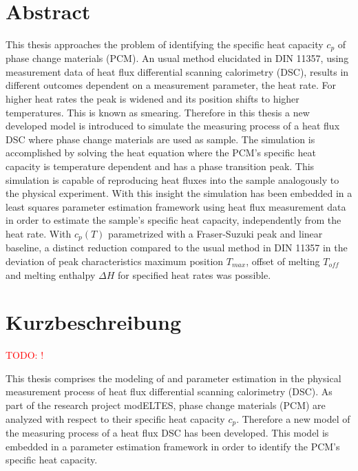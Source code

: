 \documentclass{scrartcl}[12pt, halfparskip]
\numberwithin{equation}{section}
\numberwithin{figure}{section}
\numberwithin{table}{section}
\newcommand{\todo}[1]{\textcolor{red}{TODO: #1}}
\begin{document}
\newpage


\begin{titlepage}
	\mbox{}\\
\end{titlepage}



\section*{Abstract}

This thesis approaches the problem of identifying the specific heat capacity $c_p$ of phase change materials (PCM). 
An usual method elucidated in DIN 11357, using measurement data of heat flux differential scanning calorimetry (DSC), results in different outcomes dependent on a measurement parameter, the heat rate. For higher heat rates the peak is widened and its position shifts to higher temperatures. This is known as smearing.
Therefore in this thesis a new developed model is introduced to simulate the measuring process of a heat flux DSC where phase change materials are used as sample. 
The simulation is accomplished by solving the heat equation where the PCM's specific heat capacity is temperature dependent and has a phase transition peak. 
This simulation is capable of reproducing heat fluxes into the sample analogously to the physical experiment. 
With this insight the simulation has been embedded in a least squares parameter estimation framework using heat flux measurement data in order to estimate the sample's specific heat capacity, independently from the heat rate. 
With $c_p(T)$ parametrized with a Fraser-Suzuki peak and linear baseline, a distinct reduction compared to the usual method in DIN 11357 in the deviation of peak characteristics maximum position $T_{max}$, offset of melting $T_{off}$ and melting enthalpy $\Delta H$ for specified heat rates was possible.



\section*{Kurzbeschreibung}

\todo{!}

\newpage



\tableofcontents 
\newpage


This thesis comprises the modeling of and parameter estimation in the physical measurement process of heat flux differential scanning calorimetry (DSC). As part of the research project modELTES, phase change materials (PCM) are analyzed with respect to their specific heat capacity $c_p$. Therefore a new model of the measuring process of a heat flux DSC has been developed. This model is embedded in a parameter estimation framework in order to identify the PCM's specific heat capacity. \\
\end{document}
